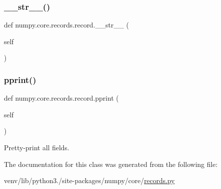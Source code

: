 \mbox{\label{classnumpy_1_1core_1_1records_1_1record_ac99f7ca15b16091cc2faf326607b6d20}} 
\subsubsection{\texorpdfstring{\+\_\+\+\_\+str\+\_\+\+\_\+()}{\_\_str\_\_()}}
{\footnotesize\ttfamily def numpy.\+core.\+records.\+record.\+\_\+\+\_\+str\+\_\+\+\_\+ (\begin{DoxyParamCaption}\item[{}]{self }\end{DoxyParamCaption})}

\mbox{\label{classnumpy_1_1core_1_1records_1_1record_ab9cd5f03e353edc69f00135eae2161f7}} 
\subsubsection{\texorpdfstring{pprint()}{pprint()}}
{\footnotesize\ttfamily def numpy.\+core.\+records.\+record.\+pprint (\begin{DoxyParamCaption}\item[{}]{self }\end{DoxyParamCaption})}

\begin{DoxyVerb}Pretty-print all fields.\end{DoxyVerb}
 

The documentation for this class was generated from the following file\+:\begin{DoxyCompactItemize}
\item 
venv/lib/python3./site-\/packages/numpy/core/\hyperlink{records_8py}{records.\+py}\end{DoxyCompactItemize}
